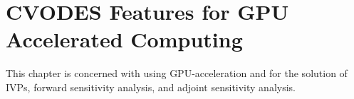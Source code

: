 \chapter{CVODES Features for GPU Accelerated Computing}\label{s:cvgpu}

This chapter is concerned with using GPU-acceleration and {\cvodes} for the solution
of IVPs, forward sensitivity analysis, and adjoint sensitivity analysis.


